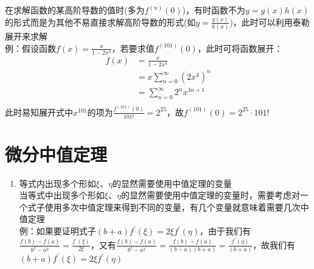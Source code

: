 \documentclass[12pt,a4paper,UTF8]{book}
\begin{document}
\begin{enumerate}
在求解函数的某高阶导数的值时(多为$f^{\left(n\right)}\left(0\right)$)，有时函数不为$y=g\left(x\right)h\left(x\right)$的形式而是为其他不易直接求解高阶导数的形式(如$y=\frac{g\left(x\right)}{h\left(x\right)}$)，此时可以利用泰勒展开来求解\\
例：假设函数$f\left(x\right)=\frac{x}{1-2x^4}$，若要求值$f^{\left(101\right)}\left(0\right)$，此时可将函数展开：\\
\[\begin{aligned}
f\left(x\right)&=\frac{x}{1-2x^4}\\
&=x\sum\limits_{n=0}^{\infty}\left(2x^4\right)^n\\
&=\sum\limits_{n=0}^{\infty}2^nx^{4n+1}\\
\end{aligned}\]
此时易知展开式中$x^{101}$的项为$\frac{f^{\left(101\right)}\left(0\right)}{101!}=2^{25}$，故$f^{\left(101\right)}\left(0\right)=2^{25}\cdot101!$
\end{enumerate}


\section{微分中值定理}
\begin{enumerate}
\item 等式内出现多个形如$\xi$、$\eta$的显然需要使用中值定理的变量\\
当等式中出现多个形如$\xi$、$\eta$的显然需要使用中值定理的变量时，需要考虑对一个式子使用多次中值定理来得到不同的变量，有几个变量就意味着需要几次中值定理\\
例：如果要证明式子$\left(b+a\right)f^{\prime}\left(\xi\right)=2\xi f^{\prime}\left(\eta\right)$，由于我们有$\frac{f\left(b\right)-f\left(a\right)}{b^2-a^2}=\frac{f^{\prime}\left(\xi\right)}{2\xi}$，又有$\frac{f\left(b\right)-f\left(a\right)}{b^2-a^2}=\frac{f\left(b\right)-f\left(a\right)}{\left(b-a\right)\left(b+a\right)}=\frac{f^{\prime}\left(\eta\right)}{\left(b+a\right)}$，故我们有$\left(b+a\right)f^{\prime}\left(\xi\right)=2\xi f^{\prime}\left(\eta\right)$
\end{enumerate}
\end{document}

